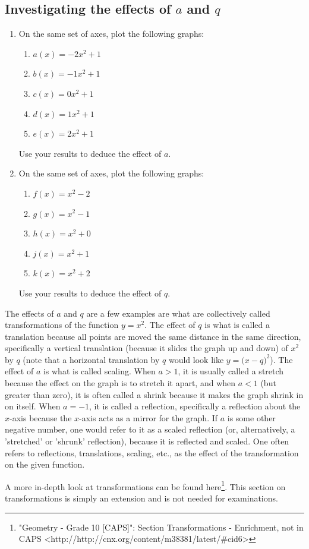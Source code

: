 \subsection*{Investigating the effects of $a$ and $q$ }
\nopagebreak
\begin{enumerate}[noitemsep, label=\textbf{\arabic*}. ] 
\item On the same set of axes, plot the following graphs:
    \begin{enumerate}[noitemsep, label=\textbf{\alph*}. ] 
    \item $a(x)=-2{x}^{2}+1$
    \item $b(x)=-1{x}^{2}+1$
    \item $c(x)=0{x}^{2}+1$
    \item $d(x)=1{x}^{2}+1$
    \item $e(x)=2{x}^{2}+1$
    \end{enumerate}
Use your results to deduce the effect of $a$.
\item On the same set of axes, plot the following graphs:
    \begin{enumerate}[noitemsep, label=\textbf{\alph*}. ] 
    \item $f(x)={x}^{2}-2$
    \item $g(x)={x}^{2}-1$
    \item $h(x)={x}^{2}+0$
    \item $j(x)={x}^{2}+1$
    \item $k(x)={x}^{2}+2$
    \end{enumerate}
Use your results to deduce the effect of $q$.
\end{enumerate}
The effects of $a$ and $q$ are a few examples are what are collectively called transformations of the function $y={x}^{2}$. The effect of $q$ is what is called a translation because all points are moved the same distance in the same direction, specifically a vertical translation (because it slides the graph up and down) of ${x}^{2}$ by $q$ (note that a horizontal translation by $q$ would look like $y=(x-q{)}^{2}$). The effect of $a$ is what is called scaling. When $a>1$, it is usually called a stretch because the effect on the graph is to stretch it apart, and when $a<1$ (but greater than zero), it is often called a shrink because it makes the graph shrink in on itself. When $a=-1$, it is called a reflection, specifically a reflection about the $x$-axis because the $x$-axis acts as a mirror for the graph. If $a$ is some other negative number, one would refer to it as a scaled reflection (or, alternatively, a 'stretched' or 'shrunk' reflection), because it is reflected and scaled. One often refers to reflections, translations, scaling, etc., as the effect of the transformation on the given function.\par A more in-depth look at transformations can be found here\footnote{\raggedright{}"Geometry - Grade 10 [CAPS]": Section Transformations - Enrichment, not in CAPS <http://http://cnx.org/content/m38381/latest/\#cid6>}. This section on transformations is simply an extension and is not needed for examinations.\par 
